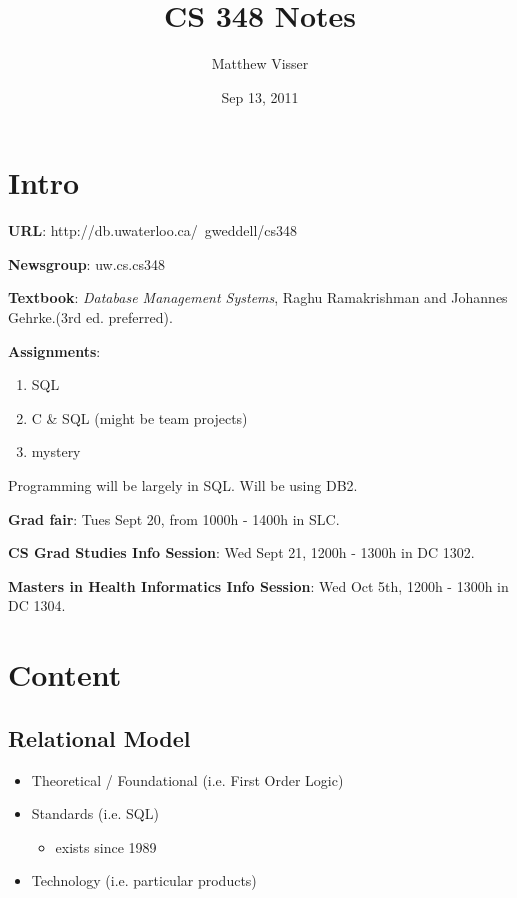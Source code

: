 \documentclass[12pt]{article}
\begin{document}
\newtheorem{mydef}{Definition}

\title{CS 348 Notes}
\author{Matthew Visser}
\date{Sep 13, 2011}
\maketitle

\section*{Intro}

\textbf{URL}: http://db.uwaterloo.ca/~gweddell/cs348

\textbf{Newsgroup}: uw.cs.cs348

\textbf{Textbook}: \textit{Database Management Systems}, Raghu Ramakrishman and
Johannes Gehrke.(3rd ed. preferred).

\textbf{Assignments}:
\begin{enumerate}
    \item SQL
    \item C \& SQL (might be team projects)
    \item mystery
\end{enumerate}

Programming will be largely in SQL. Will be using DB2.

\textbf{Grad fair}: Tues Sept 20, from 1000h - 1400h in SLC.

\textbf{CS Grad Studies Info Session}: Wed Sept 21, 1200h - 1300h in DC 1302.

\textbf{Masters in Health Informatics Info Session}: Wed Oct 5th, 1200h - 1300h
in DC 1304.

\section*{Content}

\subsection*{Relational Model}

\begin{itemize}
    \item Theoretical / Foundational (i.e. First Order Logic)
    \item Standards (i.e. SQL)
        \begin{itemize}
            \item exists since 1989
        \end{itemize}
    \item Technology (i.e. particular products)
\end{itemize}
\end{document}
